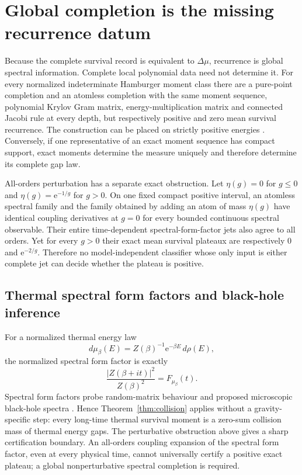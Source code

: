 \documentclass[10pt]{article}
\theoremstyle{definition}
\newcommand{\ee}{\mathrm e}
\begin{document}
\section*{Global completion is the missing recurrence datum}

Because the complete survival record is equivalent to \(\Delta\mu\),
recurrence is global spectral information. Complete local polynomial data
need not determine it. For every normalized indeterminate Hamburger moment
class there are a pure-point completion and an atomless completion with the
same moment sequence, polynomial Krylov Gram matrix, energy-multiplication
matrix and connected Jacobi rule at every depth, but respectively positive
and zero mean survival recurrence. The construction can be placed on
strictly positive energies
\cite{SalaMayato2020,LoughlinCohen2022,Yafaev2023,BergSzwarc2023}.
Conversely, if one representative of an exact
moment sequence has compact support, exact moments determine the measure
uniquely and therefore determine its complete gap law.

All-orders perturbation has a separate exact obstruction. Let
\(\eta(g)=0\) for \(g\le0\) and \(\eta(g)=\ee^{-1/g}\) for \(g>0\).
On one fixed compact positive interval, an atomless spectral family and the
family obtained by adding an atom of mass \(\eta(g)\) have identical
coupling derivatives at \(g=0\) for every bounded continuous spectral
observable. Their entire time-dependent spectral-form-factor jets also
agree to all orders. Yet for every \(g>0\) their exact mean survival
plateaux are respectively \(0\) and \(\ee^{-2/g}\). Therefore no
model-independent classifier whose only input is either complete jet can
decide whether the plateau is positive.

\subsection*{Thermal spectral form factors and black-hole inference}

For a normalized thermal energy law
\[
 d\mu_\beta(E)=Z(\beta)^{-1}\ee^{-\beta E}\,d\rho(E),
\]
the normalized spectral form factor is exactly
\begin{equation}
 \frac{|Z(\beta+it)|^2}{Z(\beta)^2}=F_{\mu_\beta}(t).
 \label{eq:sff}
\end{equation}
Spectral form factors probe random-matrix behaviour and proposed microscopic
black-hole spectra \cite{BarbonRabinovici2003,CotlerEtAl2017}. Hence
Theorem~\ref{thm:collision} applies without a gravity-specific step: every
long-time thermal survival moment is a zero-sum collision mass of thermal
energy gaps. The perturbative obstruction above gives a sharp certification
boundary. An all-orders coupling expansion of the spectral form factor,
even at every physical time, cannot universally certify a positive exact
plateau; a global nonperturbative spectral completion is required.
\end{document}
